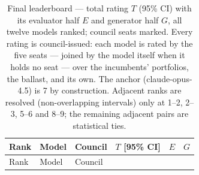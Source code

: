 \begin{longtable}[]{@{}
  >{\raggedright\arraybackslash}p{}
  >{\raggedright\arraybackslash}p{}
  >{\centering\arraybackslash}p{}
  >{\raggedleft\arraybackslash}p{}
  >{\raggedleft\arraybackslash}p{}
  >{\raggedleft\arraybackslash}p{}@{}}
\caption{Final leaderboard --- total rating \(T\) (95\% CI) with its evaluator half \(E\) and generator half \(G\), all twelve models ranked; council seats marked. Every rating is council-issued: each model is rated by the five seats --- joined by the model itself when it holds no seat --- over the incumbents' portfolios, the ballast, and its own. The anchor (claude-opus-4.5) is 7 by construction. Adjacent ranks are resolved (non-overlapping intervals) only at 1--2, 2--3, 5--6 and 8--9; the remaining adjacent pairs are statistical ties.}\tabularnewline
\toprule\noalign{}
\begin{minipage}[b]{\linewidth}\raggedright
Rank
\end{minipage} & \begin{minipage}[b]{\linewidth}\raggedright
Model
\end{minipage} & \begin{minipage}[b]{\linewidth}\centering
Council
\end{minipage} & \begin{minipage}[b]{\linewidth}\raggedleft
\textbf{\(T\) {[}95\% CI{]}}
\end{minipage} & \begin{minipage}[b]{\linewidth}\raggedleft
\(E\)
\end{minipage} & \begin{minipage}[b]{\linewidth}\raggedleft
\(G\)
\end{minipage} \\
\midrule\noalign{}
\endfirsthead
\toprule\noalign{}
\begin{minipage}[b]{\linewidth}\raggedright
Rank
\end{minipage} & \begin{minipage}[b]{\linewidth}\raggedright
Model
\end{minipage} & \begin{minipage}[b]{\linewidth}\centering
Council
\end{minipage} & \begin{minipage}[b]{\linewidth}\raggedleft

\end{minipage}
\end{longtable}
